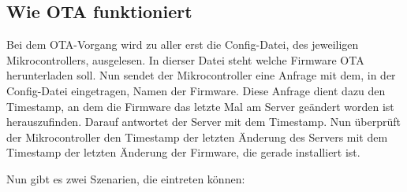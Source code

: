 \subsection*{Wie OTA funktioniert}
Bei dem OTA-Vorgang wird zu aller erst die Config-Datei, des jeweiligen Mikrocontrollers, ausgelesen. In dierser Datei steht welche Firmware OTA herunterladen soll. Nun sendet der Mikrocontroller eine Anfrage mit dem, in der Config-Datei eingetragen, Namen der Firmware. Diese Anfrage dient dazu den Timestamp, an dem die Firmware das letzte Mal am Server geändert worden ist herauszufinden.\newline
Darauf antwortet der Server mit dem Timestamp.\newline
Nun überprüft der Mikrocontroller den Timestamp der letzten Änderung des Servers mit dem Timestamp der letzten Änderung der Firmware, die gerade installiert ist.\newline

Nun gibt es zwei Szenarien, die eintreten können:

